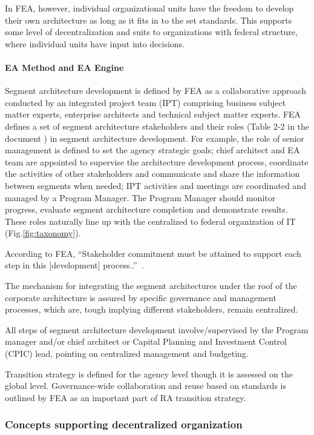 In FEA, however, individual organizational units have the freedom to develop their own architecture as long as it fits in to the set standards. This supports some level of decentralization and suits to organizations with federal structure, where individual units have input into decisions. 

\paragraph*{EA Method and EA Engine}

Segment architecture development is defined by FEA as a collaborative approach conducted by an integrated project team (IPT) comprising business subject matter experts, enterprise architects and technical subject matter experts.  FEA defines a set of segment architecture stakeholders and their roles (Table 2-2 in the document \cite{FEA_PMO2007}) in segment architecture development.   For example, the role of senior management is defined to set the agency strategic goals; chief architect and EA team are appointed to supervise the architecture development process, coordinate the activities of other stakeholders and communicate and share the information between segments when needed; IPT activities and meetings are coordinated and managed by a Program Manager. The Program Manager should monitor progress, evaluate segment architecture completion and demonstrate results. These roles naturally line up with the centralized to federal organization of IT (Fig.\ref{fig:taxonomy}).

According to FEA, ``Stakeholder commitment must be attained to support each step in this [development] process..''~\cite{FEA_PMO2007}.
 
The mechanism for integrating the segment architectures under the roof of the corporate architecture is  assured by specific governance and management processes, which are, tough implying different stakeholders, remain centralized. 

All steps of segment architecture development involve/supervised by the Program manager and/or chief architect or Capital Planning and Investment Control (CPIC) lead, pointing on centralized management and budgeting.

Transition strategy is defined for the agency level though it is assessed on the global level. Governance-wide collaboration and reuse based on standards is outlined by FEA as an important part of RA transition strategy.

\subsubsection{Concepts supporting decentralized organization}

